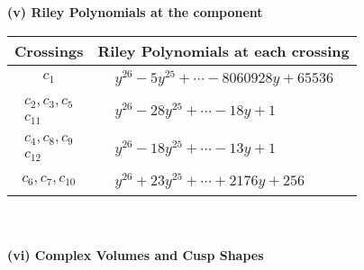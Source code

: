 \documentclass[1p]{elsarticle_modified}
\theoremstyle{definition}
\begin{document}
\newpage\renewcommand{\arraystretch}{1}
\flushleft \textbf{(v) Riley Polynomials at the component}\newline \\
\begin{tabular}{m{50pt}|m{274pt}}
Crossings & \hspace{64pt}Riley Polynomials at each crossing \\
\hline $$\begin{aligned}c_{1}\end{aligned}$$&$\begin{aligned}
&y^{26}-5 y^{25}+\cdots-8060928 y+65536
\end{aligned}$\\
\hline $$\begin{aligned}c_{2},c_{3},c_{5}\\c_{11}\end{aligned}$$&$\begin{aligned}
&y^{26}-28 y^{25}+\cdots-18 y+1
\end{aligned}$\\
\hline $$\begin{aligned}c_{4},c_{8},c_{9}\\c_{12}\end{aligned}$$&$\begin{aligned}
&y^{26}-18 y^{25}+\cdots-13 y+1
\end{aligned}$\\
\hline $$\begin{aligned}c_{6},c_{7},c_{10}\end{aligned}$$&$\begin{aligned}
&y^{26}+23 y^{25}+\cdots+2176 y+256
\end{aligned}$\\
\hline
\end{tabular}\\~\\
\newpage\flushleft \textbf{(vi) Complex Volumes and Cusp Shapes}
\end{document}
